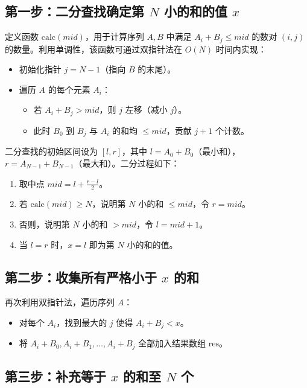 \documentclass[11pt,a4paper,twocolumn]{ctexart}  %
\begin{document}
\subsection*{第一步：二分查找确定第 $N$ 小的和的值 $x$}

定义函数 $\mathrm{calc}(mid)$，用于计算序列 $A, B$ 中满足 $A_i + B_j \leq mid$ 的数对 $(i, j)$ 的数量。利用单调性，该函数可通过双指针法在 $O(N)$ 时间内实现：
\begin{itemize}
    \item 初始化指针 $j = N - 1$（指向 $B$ 的末尾）。
    \item 遍历 $A$ 的每个元素 $A_i$：
    \begin{itemize}
        \item 若 $A_i + B_j > mid$，则 $j$ 左移（减小 $j$）。
        \item 此时 $B_0$ 到 $B_j$ 与 $A_i$ 的和均 $\leq mid$，贡献 $j + 1$ 个计数。
    \end{itemize}
\end{itemize}

二分查找的初始区间设为 $[l, r]$，其中 $l = A_0 + B_0$（最小和），$r = A_{N-1} + B_{N-1}$（最大和）。二分过程如下：
\begin{enumerate}
    \item 取中点 $mid = l + \frac{r - l}{2}$。
    \item 若 $\mathrm{calc}(mid) \geq N$，说明第 $N$ 小的和 $\leq mid$，令 $r = mid$。
    \item 否则，说明第 $N$ 小的和 $> mid$，令 $l = mid + 1$。
    \item 当 $l = r$ 时，$x = l$ 即为第 $N$ 小的和的值。
\end{enumerate}

\subsection*{第二步：收集所有严格小于 $x$ 的和}

再次利用双指针法，遍历序列 $A$：
\begin{itemize}
    \item 对每个 $A_i$，找到最大的 $j$ 使得 $A_i + B_j < x$。
    \item 将 $A_i + B_0, A_i + B_1, \dots, A_i + B_j$ 全部加入结果数组 $\mathrm{res}$。
\end{itemize}

\subsection*{第三步：补充等于 $x$ 的和至 $N$ 个}
\end{document}
